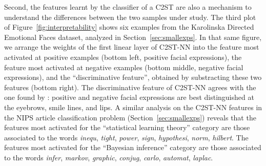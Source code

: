 \documentclass[a4paper]{article}
\begin{document}
  Second, the features learnt by the classifier of a C2ST 
  are also a mechanism to understand the differences between the two samples
  under study. The third plot of
  Figure~\ref{fig:interpretability} shows six examples from the Karolinska
  Directed Emotional Faces dataset, analyzed in Section~\ref{sec:smallexps}. In
  that same figure, we arrange the weights of the first linear layer of C2ST-NN
  into the feature most activated at positive examples
  (bottom left, positive facial expressions), the feature most activated at
  negative examples (bottom middle, negative facial expressions), and the
  ``discriminative feature'', obtained by substracting these two features
  (bottom right). The discriminative feature of C2ST-NN agrees with the one
  found by \citep{metests}: positive and negative facial expressions are best
  distinguished at the eyebrows, smile lines, and lips.  A similar analysis
  \cite{metests} on the C2ST-NN features in the NIPS article classification
  problem (Section~\ref{sec:smallexps}) reveals that the features most
  activated for the
  ``statistical learning theory'' category are those associated to the words
  \emph{inequ}, \emph{tight}, \emph{power}, \emph{sign}, \emph{hypothesi},
  \emph{norm}, \emph{hilbert}. The features most activated for
  the ``Bayesian inference'' category are those associated to the words
  \emph{infer}, \emph{markov}, \emph{graphic}, \emph{conjug}, \emph{carlo},
  \emph{automat}, \emph{laplac}.
\end{document}
